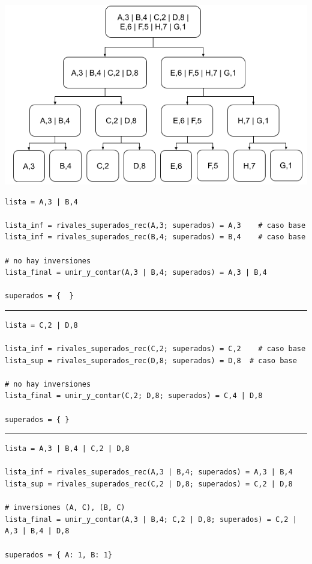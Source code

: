 \documentclass[titlepage,a4paper]{article}
\begin{document}
\begin{center}
\includegraphics[width=.9\linewidth]{assets/subproblemas.png}
\end{center}

\begin{verbatim}
lista = A,3 | B,4

lista_inf = rivales_superados_rec(A,3; superados) = A,3    # caso base
lista_inf = rivales_superados_rec(B,4; superados) = B,4    # caso base

# no hay inversiones
lista_final = unir_y_contar(A,3 | B,4; superados) = A,3 | B,4

superados = {  }
\end{verbatim}

\noindent\rule{\textwidth}{0.5pt}

\begin{verbatim}
lista = C,2 | D,8

lista_inf = rivales_superados_rec(C,2; superados) = C,2    # caso base
lista_sup = rivales_superados_rec(D,8; superados) = D,8  # caso base

# no hay inversiones
lista_final = unir_y_contar(C,2; D,8; superados) = C,4 | D,8

superados = { }
\end{verbatim}

\noindent\rule{\textwidth}{0.5pt}


\begin{verbatim}
lista = A,3 | B,4 | C,2 | D,8

lista_inf = rivales_superados_rec(A,3 | B,4; superados) = A,3 | B,4
lista_sup = rivales_superados_rec(C,2 | D,8; superados) = C,2 | D,8

# inversiones (A, C), (B, C)
lista_final = unir_y_contar(A,3 | B,4; C,2 | D,8; superados) = C,2 | A,3 | B,4 | D,8

superados = { A: 1, B: 1}
\end{verbatim}
\end{document}
